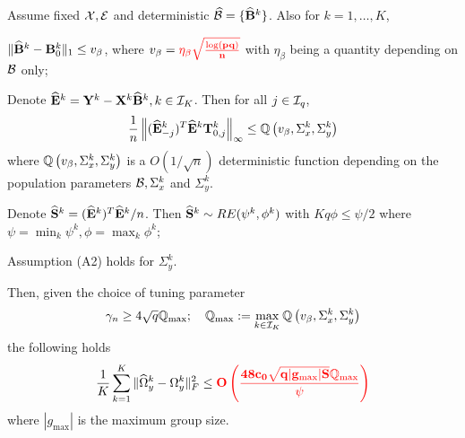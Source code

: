 \documentclass[12pt, letterpaper]{article}
\numberwithin{equation}{section}
\begin{document}
\begin{Theorem}\label{thm:ThetaThm}
Assume fixed ${\cal{X}}, {\cal{E}}$ and deterministic $\widehat {{\cal{B}}} = \{ \widehat {{\mathbf{B}}}^k \}$. Also for $k = 1, \ldots, K$,

 $\| \widehat {{\mathbf{B}}}^k - {\mathbf{B}}^k_0 \|_1 \leq v_\beta$, where $v_\beta = { \color{red} \bf \eta_\beta \sqrt{\frac{\log (pq)}{n}}}$ with $\eta_\beta$ being a quantity depending on ${\cal{B}}$ only;


 Denote \textbf{$\widehat {{\mathbf{E}}}^k = {\mathbf{Y}}^k - {\mathbf{X}}^k \widehat {{\mathbf{B}}}^k, k \in {\cal{I}}_K$}. Then for all $j \in {\cal{I}}_q$,
%
$$
\frac{1}{n} \left\| (\widehat {{\mathbf{E}}}_{-j}^k)^T \widehat {{\mathbf{E}}}^k {\mathbf{T}}_{0,j}^k \right\|_\infty \leq
{\mathbb{Q}} \left(v_\beta, \Sigma_x^k, \Sigma_y^k \right)
$$
%
where ${\mathbb{Q}} \left(v_\beta, \Sigma_x^k, \Sigma_y^k \right)$ is a $O(1/\sqrt n)$ deterministic function depending on the population parameters ${\cal{B}}, \Sigma_x^k$ and $\Sigma_y^k$.

 Denote $\widehat {{\mathbf{S}}}^k = (\widehat {{\mathbf{E}}}^k)^T \widehat {{\mathbf{E}}}^k/n$. Then $\widehat {{\mathbf{S}}}^k \sim RE(\psi^k, \phi^k)$ with $Kq \phi \leq \psi/2$ where $ \psi = \min_k \psi^k, \phi = \max_k \phi^k $;

 Assumption (A2) holds for $\Sigma_y^k$.

Then, given the choice of tuning parameter
%
$$
\gamma_n \geq 4 \sqrt q {\mathbb{Q}}_{\max}; \quad {\mathbb{Q}}_{\max} := \max_{k \in {\cal{I}}_K} {\mathbb{Q}} \left(v_\beta, \Sigma_x^k, \Sigma_y^k \right)
$$
%
the following holds
%
\begin{align}
\frac{1}{K} \sum_{k=1}^K \| \widehat \Omega_y^k - \Omega_y^k \|_F^2 \leq
{\color{red} \bf O \left( \frac{48 c_0 \sqrt{ q |g_{\max}| S} {\mathbb{Q}}_{\max}} {\psi}
\right)}
\end{align}
%
where $|g_{\max}|$ is the maximum group size.

%
\end{Theorem}
\end{document}
